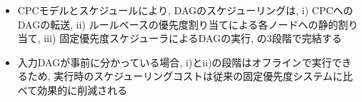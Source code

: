 \begin{frame}{}
    \begin{itemize}
        \item CPCモデルとスケジュールにより, DAGのスケジューリングは, i) CPCへのDAGの転送, ii) ルールベースの優先度割り当てによる各ノードへの静的割り当て, iii) 固定優先度スケジューラによるDAGの実行, の3段階で完結する
        \item 入力DAGが事前に分かっている場合, i)とii)の段階はオフラインで実行できるため, 実行時のスケジューリングコストは従来の固定優先度システムに比べて効果的に削減される
    \end{itemize}
\end{frame}
